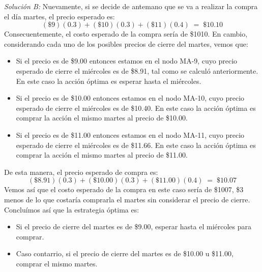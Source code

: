 \documentclass[ a4paper, twoside, 11pt]{article}
\begin{document}
\begin{problem}
\emph{Soluci\'on B:} Nuevamente, si se decide de antemano que se va a realizar la compra el d\'ia martes, el precio esperado es: 
\[
(\$9)(0.3) + (\$10)(0.3) + (\$11)(0.4) \; = \; \$10.10
\]
Consecuentemente, el costo esperado de la compra ser\'ia de \$1010. En cambio, considerando cada uno de los posibles precios de cierre del martes, vemos que: 
\begin{itemize}
\item Si el precio es de \$9.00 entonces estamos en el nodo MA-9, cuyo precio esperado de cierre el mi\'ercoles es de \$8.91, tal como se calcul\'o anteriormente. En este caso la acci\'on \'optima es esperar hasta el mi\'ercoles. 
\item Si el precio es de \$10.00 entonces estamos en el nodo MA-10, cuyo precio esperado de cierre el mi\'ercoles es de \$10.40. En este caso la acci\'on \'optima es comprar la acci\'on el mismo martes al precio de \$10.00. 
\item Si el precio es de \$11.00 entonces estamos en el nodo MA-11, cuyo precio esperado de cierre el mi\'ercoles es de \$11.66. En este caso la acci\'on \'optima es comprar la acci\'on el mismo martes al precio de \$11.00. 
\end{itemize}
De esta manera, el precio esperado de compra es: 
\[
(\$8.91)(0.3) + (\$10.00)(0.3) + (\$11.00)(0.4) \; = \; \$10.07
\]
Vemos as\'i que el costo esperado de la compra en este caso ser\'ia de \$1007, \ie \$3 menos de lo que costar\'ia comprarla el martes sin considerar el precio de cierre. Conclu\'imos as\'i que la estrategia \'optima es: 
\begin{itemize}
\item Si el precio de cierre del martes es de \$9.00, esperar hasta el mi\'ercoles para comprar. 
\item Caso contarrio, \ie si el precio de cierre del martes es de \$10.00 u \$11.00, comprar el mismo martes. 
\end{itemize}


\end{problem}
\fullskip
\end{document}
